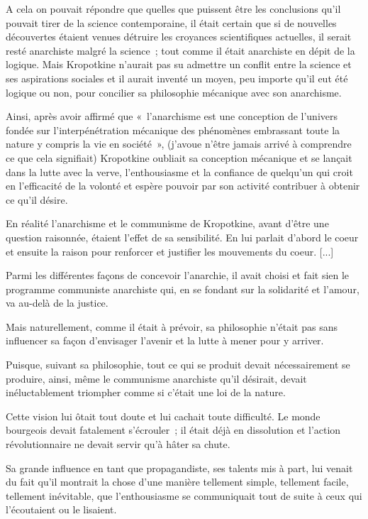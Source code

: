 \documentclass[french,twoside]{book} %
\begin{document}
A cela on pouvait répondre que quelles que puissent être les conclusions qu’il pouvait tirer de la science contemporaine, il était certain que si de nouvelles découvertes étaient venues détruire les croyances scientifiques actuelles, il serait resté anarchiste malgré la science ; tout comme il était anarchiste en dépit de la logique. Mais Kropotkine n’aurait pas su admettre un conflit entre la science et ses aspirations sociales et il aurait inventé un moyen, peu importe qu’il eut été logique ou non, pour concilier sa philosophie mécanique avec son anarchisme.\par
Ainsi, après avoir affirmé que « l’anarchisme est une conception de l’univers fondée sur l’interpénétration mécanique des phénomènes embrassant toute la nature y compris la vie en société », (j’avoue n’être jamais arrivé à comprendre ce que cela signifiait) Kropotkine oubliait sa conception mécanique et se lançait dans la lutte avec la verve, l’enthousiasme et la confiance de quelqu’un qui croit en l’efficacité de la volonté et espère pouvoir par son activité contribuer à obtenir ce qu’il désire.\par
En réalité l’anarchisme et le communisme de Kropotkine, avant d’être une question raisonnée, étaient l’effet de sa sensibilité. En lui parlait d’abord le coeur et ensuite la raison pour renforcer et justifier les mouvements du coeur. [...]\par
Parmi les différentes façons de concevoir l’anarchie, il avait choisi et fait sien le programme communiste anarchiste qui, en se fondant sur la solidarité et l’amour, va au-delà de la justice.\par
Mais naturellement, comme il était à prévoir, sa philosophie n’était pas sans influencer sa façon d’envisager l’avenir et la lutte à mener pour y arriver.\par
Puisque, suivant sa philosophie, tout ce qui se produit devait nécessairement se produire, ainsi, même le communisme anarchiste qu’il désirait, devait inéluctablement triompher comme si c’était une loi de la nature.\par
Cette vision lui ôtait tout doute et lui cachait toute difficulté. Le monde bourgeois devait fatalement s’écrouler ; il était déjà en dissolution et l’action révolutionnaire ne devait servir qu’à hâter sa chute.\par
Sa grande influence en tant que propagandiste, ses talents mis à part, lui venait du fait qu’il montrait la chose d’une manière tellement simple, tellement facile, tellement inévitable, que l’enthousiasme se communiquait tout de suite à ceux qui l’écoutaient ou le lisaient.\par
\end{document}
